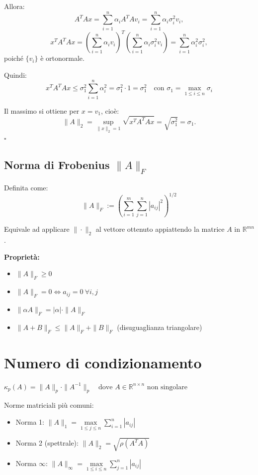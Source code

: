 \documentclass[12pt,a4paper]{article}
\begin{document}
Allora:
\[
A^T A x = \sum_{i=1}^n \alpha_i A^T A v_i = \sum_{i=1}^n \alpha_i \sigma_i^2 v_i,
\]
\[
x^T A^T A x = \left( \sum_{i=1}^n \alpha_i v_i \right)^T \left( \sum_{i=1}^n \alpha_i \sigma_i^2 v_i \right) = \sum_{i=1}^n \alpha_i^2 \sigma_i^2,
\]
poiché $\{v_i\}$ è ortonormale.

Quindi:
\[
x^T A^T A x \leq \sigma_1^2 \sum_{i=1}^n \alpha_i^2 = \sigma_1^2 \cdot 1 = \sigma_1^2 \quad \text{con }\sigma_1=\max_{1\leq i \leq n}\sigma_i
\]

Il massimo si ottiene per $x = v_1$, cioè:
\[
\|A\|_2 = \sup_{\|x\|_2 = 1} \sqrt{x^T A^T A x} = \sqrt{\sigma_1^2} = \sigma_1.
\]
\hfill $\square$


\subsection*{Norma di Frobenius $\|A\|_F$}

Definita come:
\[
\|A\|_F := \left( \sum_{i=1}^m \sum_{j=1}^n |a_{ij}|^2 \right)^{1/2}
\]

Equivale ad applicare $\| \cdot \|_2$ al vettore ottenuto appiattendo la matrice $A$ in $\mathbb{R}^{mn}$.

\textbf{Proprietà:}
\begin{itemize}
  \item $\|A\|_F \ge 0$
  \item $\|A\|_F = 0 \Leftrightarrow a_{ij} = 0\ \forall i,j$
  \item $\|\alpha A\|_F = |\alpha| \cdot \|A\|_F$
  \item $\|A + B\|_F \le \|A\|_F + \|B\|_F$ (disuguaglianza triangolare)
\end{itemize}
\newpage
\section*{Numero di condizionamento}

\begin{flushleft}
$\displaystyle
\kappa_p(A) = \|A\|_p \cdot \|A^{-1}\|_p \quad \text{dove } A \in \mathbb{R}^{n \times n} \text{ non singolare}
$

\vspace{0.5em}
\vspace{0.5em}

Norme matriciali più comuni:

\begin{itemize}
\item Norma 1: $\|A\|_1 = \max\limits_{1 \leq j \leq n} \sum_{i=1}^n |a_{ij}|$
\item Norma 2 (spettrale): $\|A\|_2 = \sqrt{\rho(A^TA)}$
\vspace{0.8em}

\item Norma $\infty$: $\|A\|_\infty = \max\limits_{1 \leq i \leq n} \sum_{j=1}^n |a_{ij}|$
\end{itemize}
\end{flushleft}
\end{document}
